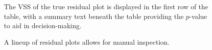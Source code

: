 \documentclass[
doublespace,
  times]{anzsauth}
\begin{document}
\begin{figure}


\caption{\label{fig-autovi-web-workflow-example4}The VSS of the true
residual plot is displayed in the first row of the table, with a summary
text beneath the table providing the \(p\)-value to aid in
decision-making.}

\end{figure}%

\begin{figure}


\caption{\label{fig-autovi-web-workflow-example5}A lineup of residual
plots allows for manual inspection.}

\end{figure}%
\end{document}
